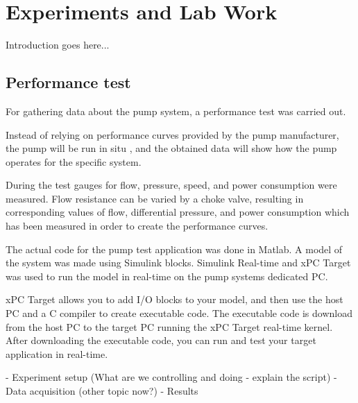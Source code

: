 \chapter{Experiments and Lab Work}\label{ch:experiment}
Introduction goes here... 
 
\section{Performance test}\label{sec:performance_test} 
For gathering data about the pump system, a performance test was carried out.

Instead of relying on performance curves provided by the pump manufacturer,
the pump will be run in situ , and the obtained data will show how the pump 
operates for the specific system.
 
During the test gauges for flow, pressure, speed, and power consumption were 
measured. Flow resistance can be varied by a choke valve, resulting in 
corresponding values of flow, differential pressure, and power consumption 
which has been measured in order to create the performance curves.
 
The actual code for the pump test application was done in Matlab. 
A model of the system was made using Simulink blocks. 
Simulink Real-time and xPC Target was used to run the model in real-time 
on the pump systems dedicated PC. 

xPC Target allows you to add I/O blocks to your model, and then use the host 
PC and a C compiler to create executable code. The executable code is download 
from the host PC to the target PC running the xPC Target real-time kernel. 
After downloading the executable code, you can run and test your target 
application in real-time. 

- Experiment setup (What are we controlling and doing - explain the script)
- Data acquisition (other topic now?)
- Results
 